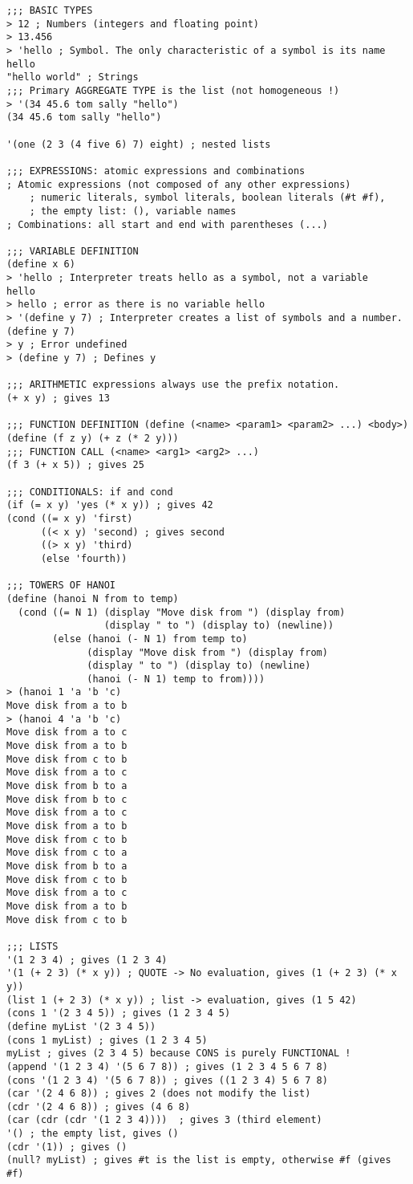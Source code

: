 \documentclass[20pt]{article}
\begin{document}
\begin{verbatim}
;;; BASIC TYPES
> 12 ; Numbers (integers and floating point)
> 13.456 
> 'hello ; Symbol. The only characteristic of a symbol is its name
hello
"hello world" ; Strings
;;; Primary AGGREGATE TYPE is the list (not homogeneous !)
> '(34 45.6 tom sally "hello")
(34 45.6 tom sally "hello")

'(one (2 3 (4 five 6) 7) eight) ; nested lists

;;; EXPRESSIONS: atomic expressions and combinations
; Atomic expressions (not composed of any other expressions)
    ; numeric literals, symbol literals, boolean literals (#t #f), 
    ; the empty list: (), variable names
; Combinations: all start and end with parentheses (...)

;;; VARIABLE DEFINITION
(define x 6)
> 'hello ; Interpreter treats hello as a symbol, not a variable
hello
> hello ; error as there is no variable hello
> '(define y 7) ; Interpreter creates a list of symbols and a number.
(define y 7)
> y ; Error undefined
> (define y 7) ; Defines y

;;; ARITHMETIC expressions always use the prefix notation.
(+ x y) ; gives 13

;;; FUNCTION DEFINITION (define (<name> <param1> <param2> ...) <body>)
(define (f z y) (+ z (* 2 y)))
;;; FUNCTION CALL (<name> <arg1> <arg2> ...)
(f 3 (+ x 5)) ; gives 25

;;; CONDITIONALS: if and cond
(if (= x y) 'yes (* x y)) ; gives 42
(cond ((= x y) 'first)
      ((< x y) 'second) ; gives second
      ((> x y) 'third)
      (else 'fourth))

;;; TOWERS OF HANOI
(define (hanoi N from to temp)
  (cond ((= N 1) (display "Move disk from ") (display from)
                 (display " to ") (display to) (newline))
        (else (hanoi (- N 1) from temp to)
              (display "Move disk from ") (display from)
              (display " to ") (display to) (newline)
              (hanoi (- N 1) temp to from))))
> (hanoi 1 'a 'b 'c)
Move disk from a to b
> (hanoi 4 'a 'b 'c)
Move disk from a to c
Move disk from a to b
Move disk from c to b
Move disk from a to c
Move disk from b to a
Move disk from b to c
Move disk from a to c
Move disk from a to b
Move disk from c to b
Move disk from c to a
Move disk from b to a
Move disk from c to b
Move disk from a to c
Move disk from a to b
Move disk from c to b

;;; LISTS
'(1 2 3 4) ; gives (1 2 3 4)
'(1 (+ 2 3) (* x y)) ; QUOTE -> No evaluation, gives (1 (+ 2 3) (* x y))
(list 1 (+ 2 3) (* x y)) ; list -> evaluation, gives (1 5 42)
(cons 1 '(2 3 4 5)) ; gives (1 2 3 4 5)
(define myList '(2 3 4 5))
(cons 1 myList) ; gives (1 2 3 4 5)
myList ; gives (2 3 4 5) because CONS is purely FUNCTIONAL !
(append '(1 2 3 4) '(5 6 7 8)) ; gives (1 2 3 4 5 6 7 8)
(cons '(1 2 3 4) '(5 6 7 8)) ; gives ((1 2 3 4) 5 6 7 8)
(car '(2 4 6 8)) ; gives 2 (does not modify the list)
(cdr '(2 4 6 8)) ; gives (4 6 8)
(car (cdr (cdr '(1 2 3 4))))  ; gives 3 (third element)
'() ; the empty list, gives ()
(cdr '(1)) ; gives ()
(null? myList) ; gives #t is the list is empty, otherwise #f (gives #f)


\end{verbatim}
\end{document}

